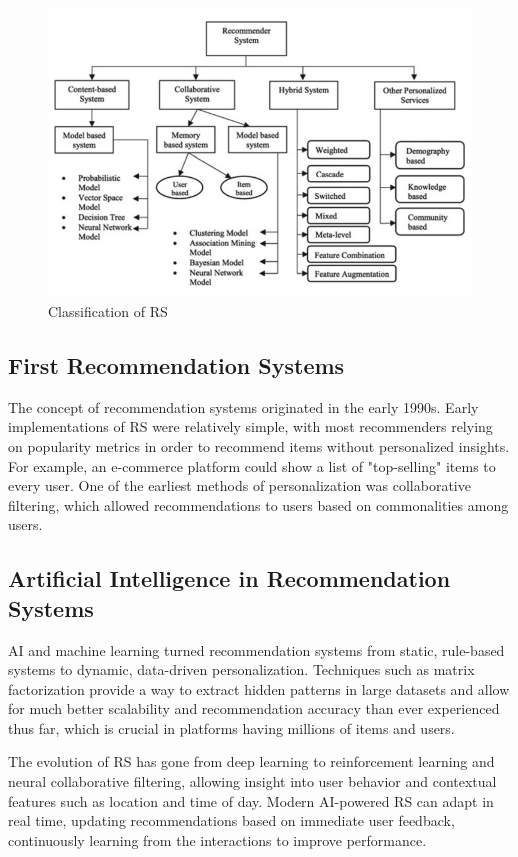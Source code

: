 \documentclass{article}
\begin{document}
\clearpage
\begin{figure}[!h]
    \centering
    \includegraphics[width=1\textwidth]{src/RS_classification.png}
    \caption{Classification of RS \cite{RS_AA_2}}
    \label{fig:RS-Classification}
\end{figure}
\subsection{First Recommendation Systems} 
The concept of recommendation systems originated in the early 1990s. Early implementations of RS were relatively simple, with most recommenders relying on popularity metrics in order to recommend items without personalized insights. For example, an e-commerce platform could show a list of "top-selling" items to every user. One of the earliest methods of personalization was collaborative filtering, which allowed recommendations to users based on commonalities among users.

\subsection{Artificial Intelligence in Recommendation Systems}

AI and machine learning turned recommendation systems from static, rule-based systems to dynamic, data-driven personalization. Techniques such as matrix factorization provide a way to extract hidden patterns in large datasets and allow for much better scalability and recommendation accuracy than ever experienced thus far, which is crucial in platforms having millions of items and users.

The evolution of RS has gone from deep learning to reinforcement learning and neural collaborative filtering, allowing insight into user behavior and contextual features such as location and time of day. Modern AI-powered RS can adapt in real time, updating recommendations based on immediate user feedback, continuously learning from the interactions to improve performance.\cite{AI_in_RS}
\end{document}
